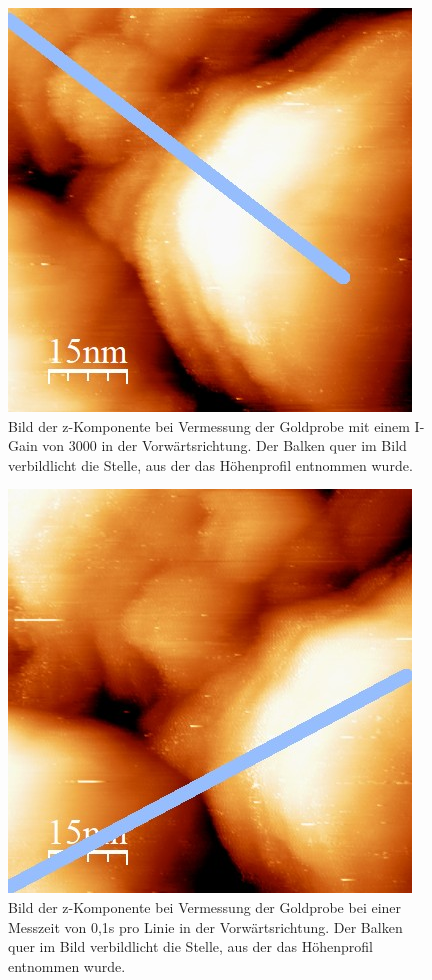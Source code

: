 \documentclass[12pt,a4paper]{article}
\begin{document}
\begin{figure}
\centering
\includegraphics[scale=0.8]{Bilder/3000_IGain_vor.jpg}
\caption{Bild der z-Komponente bei Vermessung der Goldprobe mit einem I-Gain von 3000 in der Vorwärtsrichtung. Der Balken quer im Bild verbildlicht die Stelle, aus der das Höhenprofil entnommen wurde.}
\label{fig:Gold_IGain_Beispiel}
\end{figure}

\begin{figure}
\centering
\includegraphics[scale=0.8]{Bilder/0_1_Zeit_vor.jpg}
\caption{Bild der z-Komponente bei Vermessung der Goldprobe bei einer Messzeit von 0,1s pro Linie in der Vorwärtsrichtung. Der Balken quer im Bild verbildlicht die Stelle, aus der das Höhenprofil entnommen wurde.}
\label{fig:Gold_Zeit_Beispiel}
\end{figure}
\end{document}
